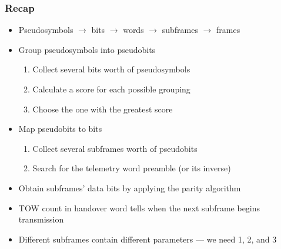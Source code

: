 \documentclass[aspectratio=169, xcolor=table]{beamer}
\begin{document}
\begin{frame}
    \frametitle{Recap}

    \begin{itemize}
        \item<2-> Pseudosymbols $\rightarrow$ bits $\rightarrow$ words $\rightarrow$ subframes $\rightarrow$ frames
        
        \item<3-> Group pseudosymbols into pseudobits

        \begin{enumerate}
            \item<4-> Collect several bits worth of pseudosymbols

            \item<5-> Calculate a score for each possible grouping

            \item<6-> Choose the one with the greatest score
        \end{enumerate}

        \item<7-> Map pseudobits to bits

        \begin{enumerate}
            \item<8-> Collect several subframes worth of pseudobits

            \item<9-> Search for the telemetry word preamble (or its inverse)
        \end{enumerate}

        \item<10-> Obtain subframes' data bits by applying the parity algorithm
        
        \item<11-> TOW count in handover word tells when the next subframe begins transmission

        \item<12-> Different subframes contain different parameters — we need 1, 2, and 3
    \end{itemize}
\end{frame}
\end{document}
